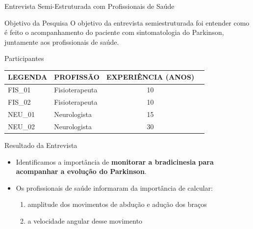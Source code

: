 \documentclass{beamer}
\begin{document}
\begin{frame}{Entrevista Semi-Estruturada com Profissionais de Saúde} 
    \begin{block}{Objetivo da Pesquisa}
    O objetivo da entrevista semiestruturada foi entender como é feito o acompanhamento do paciente com sintomatologia do Parkinson, juntamente aos profissionais de saúde.
    \end{block}
		\begin{block}{Participantes}
			\begin{table}[h]
			\begin{tabular}{|l|l|c|c|}
			\hline
			\textbf{LEGENDA} & \textbf{PROFISSÃO}             & \multicolumn{1}{|l|}{\textbf{EXPERIÊNCIA (ANOS)}} \\ \hline
			FIS\_01          & Fisioterapeuta & 10                                                \\ \hline
			FIS\_02          & Fisioterapeuta    & 10                                                \\ \hline
			NEU\_01          & Neurologista            & 15                                                \\ \hline
			NEU\_02          & Neurologista            & 30                                                \\ \hline
			\end{tabular}
			\end{table}
    \end{block}
\end{frame} 

\begin{frame}{Resultado da Entrevista} 
    \begin{block}{}
			\begin{itemize}
				\item Identificamos a importância de \textbf{monitorar a bradicinesia para acompanhar a evolução do Parkinson}.
				\item Os profissionais de saúde informaram da importância de calcular:
					\begin{enumerate}
						\item amplitude dos movimentos de abdução e adução dos braços
						\item a velocidade angular desse movimento
					\end{enumerate}
			\end{itemize}
    \end{block}
\end{frame} 
\end{document}
